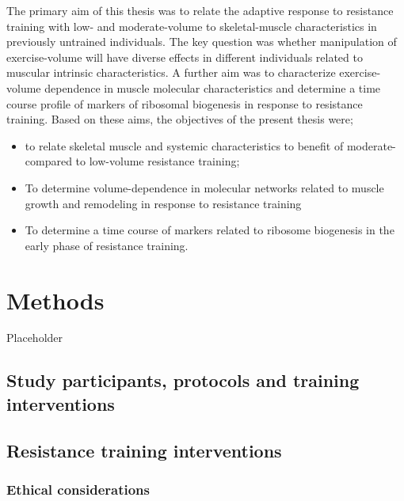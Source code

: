 \documentclass[twoside,10pt]{gihclass} %
\providecommand{\tightlist}{%
  \setlength{\itemsep}{0pt}\setlength{\parskip}{0pt}}
\begin{document}
The primary aim of this thesis was to relate the adaptive response to resistance training with low- and moderate-volume to skeletal-muscle characteristics in previously untrained individuals. The key question was whether manipulation of exercise-volume will have diverse effects in different individuals related to muscular intrinsic characteristics. A further aim was to characterize exercise-volume dependence in muscle molecular characteristics and determine a time course profile of markers of ribosomal biogenesis in response to resistance training. Based on these aims, the objectives of the present thesis were;
\begin{itemize}
\tightlist
\item
  to relate skeletal muscle and systemic characteristics to benefit of moderate- compared to low-volume resistance training;
\item
  To determine volume-dependence in molecular networks related to muscle growth and remodeling in response to resistance training
\item
  To determine a time course of markers related to ribosome biogenesis in the early phase of resistance training.
\end{itemize}
\hypertarget{methods}{%
\chapter{Methods}\label{methods}}

Placeholder

\hypertarget{study-participants-protocols-and-training-interventions}{%
\section{Study participants, protocols and training interventions}\label{study-participants-protocols-and-training-interventions}}

\hypertarget{resistance-training-interventions}{%
\section{Resistance training interventions}\label{resistance-training-interventions}}

\hypertarget{ethical-considerations}{%
\subsection{Ethical considerations}\label{ethical-considerations}}
\end{document}
